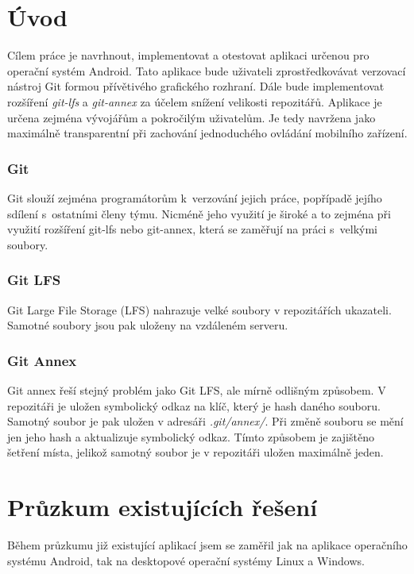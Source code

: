 \chapter{Úvod}
Cílem práce je navrhnout, implementovat a otestovat aplikaci určenou pro operační systém Android. Tato aplikace bude uživateli zprostředkovávat verzovací nástroj Git formou přívětivého grafického rozhraní. Dále bude implementovat rozšíření \emph{git-lfs} a \emph{git-annex} za účelem snížení velikosti repozitářů. Aplikace je určena zejména vývojářům a pokročilým uživatelům. Je tedy navržena jako maximálně transparentní při zachování jednoduchého ovládání mobilního zařízení.

\subsection {Git}
Git slouží zejména programátorům k verzování jejich práce, popřípadě jejího sdílení s ostatními členy týmu. Nicméně jeho využití je široké a to zejména při využití rozšíření git-lfs nebo git-annex, která se zaměřují na práci s velkými soubory.

\subsection{Git LFS}
Git Large File Storage (LFS) nahrazuje velké soubory v repozitářích ukazateli. Samotné soubory jsou pak uloženy na vzdáleném serveru.

\subsection{Git Annex}
Git annex řeší stejný problém jako Git LFS, ale mírně odlišným způsobem. V repozitáři je uložen symbolický odkaz na klíč, který je hash daného souboru. Samotný soubor je pak uložen v adresáři \emph{.git/annex/}. Při změně souboru se mění jen jeho hash a aktualizuje symbolický odkaz. Tímto způsobem je zajištěno šetření místa, jelikož samotný soubor je v repozitáři uložen maximálně jeden.

\chapter{Průzkum existujících řešení}
Během průzkumu již existující aplikací jsem se zaměřil jak na aplikace operačního systému Android, tak na desktopové operační systémy Linux a Windows.

